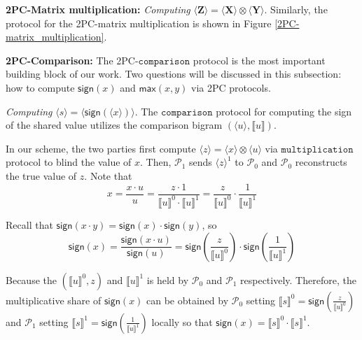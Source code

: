 \documentclass[letterpaper]{article} %
\begin{document}
    \textbf{2PC-Matrix multiplication:}
    \emph{Computing} $ \langle \mathbf{Z}\rangle  = \langle \mathbf{X}\rangle  \otimes \langle \mathbf{Y}\rangle$.
    Similarly, the protocol for the 2PC-matrix multiplication is shown in Figure \ref{2PC-matrix_multiplication}.

    \textbf{2PC-Comparison:}
    The 2PC-$\mathtt{comparison}$ protocol is the most important building block of our work.
    Two questions will be discussed in this subsection:
    how to compute $\mathsf{sign}(x)$ and $\mathsf{max}(x,y)$ via 2PC protocols.


    \emph{Computing} $\langle s\rangle  = \langle \mathsf{sign}(\langle x\rangle)\rangle $.
    The $\mathtt{comparison}$ protocol for computing the sign of the shared value utilizes the comparison bigram $(\langle u\rangle,\llbracket u \rrbracket )$.

    In our scheme, the two parties first compute $ \langle z\rangle = \langle x\rangle\otimes \langle u\rangle$
    via $\mathtt{multiplication}$ protocol
    to blind the value of $x$.
    Then, $\mathcal{P}_{1}$ sends  $ \langle z\rangle^{1}$ to $\mathcal{P}_{0}$ and
    $\mathcal{P}_{0}$ reconstructs the true value of $z$.
    Note that
    $$x=\frac{x\cdot u}{u}
        =\frac{z\cdot 1}{\llbracket u \rrbracket^{0}\cdot \llbracket u \rrbracket^{1}}
        =\frac{z}{\llbracket u \rrbracket^{0}}\cdot\frac{1}{\llbracket u \rrbracket^{1}}$$

    Recall that $\mathsf{sign}(x\cdot y)=\mathsf{sign}(x)\cdot \mathsf{sign}(y)$, so
    $$\mathsf{sign}(x)=\frac{\mathsf{sign}(x \cdot u)}{\mathsf{sign}(u)}
    =\mathsf{sign}(\frac{z}{\llbracket u \rrbracket^{0}})
    \cdot \mathsf{sign}(\frac{1}{\llbracket u \rrbracket^{1}})$$

    Because the $(\llbracket u \rrbracket^{0},z)$ and $\llbracket u \rrbracket^{1}$
    is held by $\mathcal{P}_{0}$ and $\mathcal{P}_{1}$ respectively.
    Therefore, the multiplicative share of $\mathsf{sign}(x)$ can be obtained by
    $\mathcal{P}_{0}$ setting $\llbracket s \rrbracket^{0}
    =\mathsf{sign}(\frac{z}{\llbracket u \rrbracket^{0}})$
    and $\mathcal{P}_{1}$ setting $\llbracket s \rrbracket^{1}
    =\mathsf{sign}(\frac{1}{\llbracket u \rrbracket^{1}})$ locally
    so that $\mathsf{sign}(x)=\llbracket s \rrbracket^{0}\cdot \llbracket s \rrbracket^{1}$.
\end{document}
